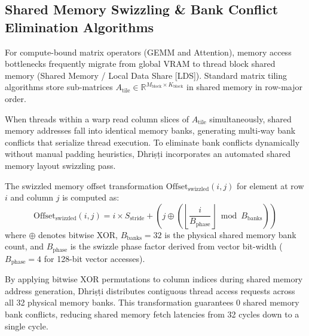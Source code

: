 \documentclass[10pt,journal,compsoc]{IEEEtran}
\begin{document}
\subsection{Shared Memory Swizzling \& Bank Conflict Elimination Algorithms}
For compute-bound matrix operators (GEMM and Attention), memory access bottlenecks frequently migrate from global VRAM to thread block shared memory (Shared Memory / Local Data Share [LDS]). Standard matrix tiling algorithms store sub-matrices $A_{\text{tile}} \in \mathbb{R}^{M_{\text{block}} \times K_{\text{block}}}$ in shared memory in row-major order.

When threads within a warp read column slices of $A_{\text{tile}}$ simultaneously, shared memory addresses fall into identical memory banks, generating multi-way bank conflicts that serialize thread execution. To eliminate bank conflicts dynamically without manual padding heuristics, Dhri\d{s}\d{t}i incorporates an automated shared memory layout swizzling pass.

The swizzled memory offset transformation $\text{Offset}_{\text{swizzled}}(i, j)$ for element at row $i$ and column $j$ is computed as:
\begin{equation}
\text{Offset}_{\text{swizzled}}(i, j) = i \times S_{\text{stride}} + \left( j \oplus \left( \left\lfloor \frac{i}{B_{\text{phase}}} \right\rfloor \bmod B_{\text{banks}} \right) \right)
\end{equation}
where $\oplus$ denotes bitwise XOR, $B_{\text{banks}} = 32$ is the physical shared memory bank count, and $B_{\text{phase}}$ is the swizzle phase factor derived from vector bit-width ($B_{\text{phase}} = 4$ for 128-bit vector accesses).

By applying bitwise XOR permutations to column indices during shared memory address generation, Dhri\d{s}\d{t}i distributes contiguous thread access requests across all 32 physical memory banks. This transformation guarantees 0 shared memory bank conflicts, reducing shared memory fetch latencies from 32 cycles down to a single cycle.
\end{document}
